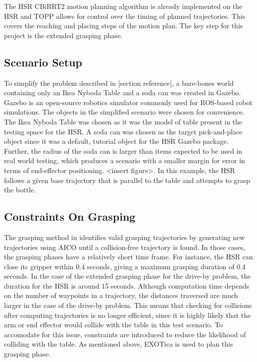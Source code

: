 \documentclass[12pt]{article}
\begin{document}
            The HSR CBiRRT2 motion planning algorithm is already implemented on the HSR and TOPP allows for control over the timing of planned trajectories. This covers the reaching and placing steps of the motion plan. The key step for this project is the extended grasping phase.

        \subsection{Scenario Setup}
            To simplify the problem described in [section reference], a bare-bones world containing only an Ikea Nyboda Table and a soda can was created in Gazebo. Gazebo is an open-source robotics simulator commonly used for ROS-based robot simulations. The objects in the simplified scenario were chosen for convenience. The Ikea Nyboda Table was chosen as it was the model of table present in the testing space for the HSR. A soda can was chosen as the target pick-and-place object since it was a default, tutorial object for the HSR Gazebo package. Further, the radius of the soda can is larger than items expected to be used in real world testing, which produces a scenario with a smaller margin for error in terms of end-effector positioning. <insert figure>. In this example, the HSR follows a given base trajectory that is parallel to the table and attempts to grasp the bottle.
            
        \subsection{Constraints On Grasping}
            The grasping method in \cite{yang_planning_2018} identifies valid grasping trajectories by generating new trajectories using AICO until a collision-free trajectory is found. In those cases, the grasping phases have a relatively short time frame. For instance, the HSR can close its gripper within 0.4 seconds, giving a maximum grasping duration of 0.4 seconds. In the case of the extended grasping phase for the drive-by problem, the duration for the HSR is around 15 seconds. Although computation time depends on the number of waypoints in a trajectory, the distances traversed are much larger in the case of the drive-by problem. This means that checking for collisions after computing trajectories is no longer efficient, since it is highly likely that the arm or end effector would collide with the table in this test scenario. To accomodate for this issue, constraints are introduced to reduce the likelihood of colliding with the table. As mentioned above, EXOTica is used to plan this grasping phase.
\end{document}
